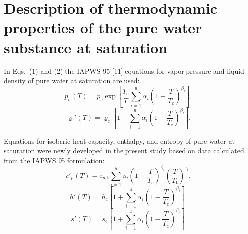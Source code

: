 \documentclass[11pt]{article}
\newcommand{\dens}{\varrho}
\begin{document}
\section{Description of thermodynamic properties of the pure water
         substance at saturation}

In Eqs.~(1) and (2) the IAPWS 95 [11] equations for vapor pressure and
liquid density of pure water at saturation are used:
\begin{equation}
p_\sigma(T) = p_\mathrm{c}\exp\left[\frac{T_\mathrm{c}}{T}
  \sum_{i=1}^{6}\alpha_i
  \left(1-\frac{T}{T_\mathrm{c}}\right)^{\beta_i}\right],
\end{equation}
\begin{equation}
\dens'(T) = \dens_\mathrm{c}\left[1 + \sum_{i=1}^{6}\alpha_i
  \left(1-\frac{T}{T_\mathrm{c}}\right)^{\beta_i}\right].
\end{equation}

\noindent Equations for isobaric heat capacity, enthalpy, and entropy
of pure water at saturation were newly developed in the present study
based on data calculated from the IAPWS 95 formulation:
\begin{equation}
c'_p(T) = c_{p,\mathrm{t}}\sum_{i=1}^{5}\alpha_i
  \left(1-\frac{T}{T_\mathrm{c}}\right)^{\beta_i}
  \left(\frac{T}{T_\mathrm{t}}\right)^{\gamma_i},
\end{equation}
\begin{equation}
h'(T) = h_\mathrm{c}\left[1 + \sum_{i=1}^{4}\alpha_i
  \left(1-\frac{T}{T_\mathrm{c}}\right)^{\beta_i}\right],
\end{equation}
\begin{equation}
s'(T) = s_\mathrm{c}\left[1 + \sum_{i=1}^{4}\alpha_i
  \left(1-\frac{T}{T_\mathrm{c}}\right)^{\beta_i}\right].
\end{equation}

\end{document}

